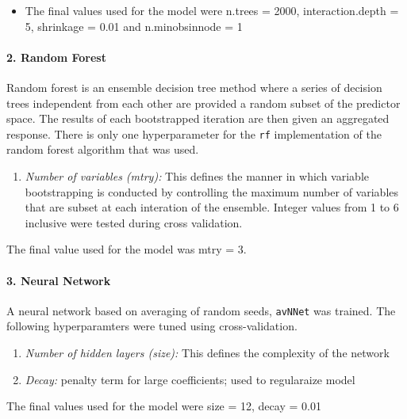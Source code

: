 \documentclass{article}
\begin{document}
\begin{itemize}
\tightlist
\item
  The final values used for the model were n.trees = 2000,
  interaction.depth = 5, shrinkage = 0.01 and n.minobsinnode = 1
\end{itemize}

\hypertarget{random-forest}{%
\paragraph{2. Random Forest}\label{random-forest}}

Random forest is an ensemble decision tree method where a series of
decision trees independent from each other are provided a random subset
of the predictor space. The results of each bootstrapped iteration are
then given an aggregated response. There is only one hyperparameter for
the \texttt{rf} implementation of the random forest algorithm that was
used.

\begin{enumerate}
\def\labelenumi{\arabic{enumi}.}
\tightlist
\item
  \emph{Number of variables (mtry):} This defines the manner in which
  variable bootstrapping is conducted by controlling the maximum number
  of variables that are subset at each interation of the ensemble.
  Integer values from 1 to 6 inclusive were tested during cross
  validation.
\end{enumerate}

The final value used for the model was mtry = 3.

\hypertarget{neural-network}{%
\paragraph{3. Neural Network}\label{neural-network}}

A neural network based on averaging of random seeds, \texttt{avNNet} was
trained. The following hyperparamters were tuned using cross-validation.

\begin{enumerate}
\def\labelenumi{\arabic{enumi}.}
\tightlist
\item
  \emph{Number of hidden layers (size):} This defines the complexity of
  the network
\item
  \emph{Decay:} penalty term for large coefficients; used to regularaize
  model
\end{enumerate}

The final values used for the model were size = 12, decay = 0.01
\end{document}
